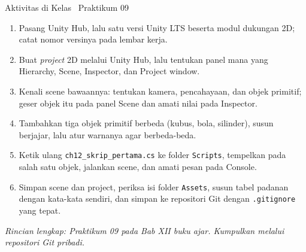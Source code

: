 \documentclass[aspectratio=169,10pt]{beamer}
\begin{document}
\begin{frame}{Aktivitas di Kelas \textperiodcentered\ Praktikum 09}
\begin{enumerate}
  \item Pasang Unity Hub, lalu satu versi Unity LTS beserta modul dukungan 2D;
        catat nomor versinya pada lembar kerja.
  \item Buat \emph{project} 2D melalui Unity Hub, lalu tentukan panel mana yang
        Hierarchy, Scene, Inspector, dan Project window.
  \item Kenali scene bawaannya: tentukan kamera, pencahayaan, dan objek
        primitif; geser objek itu pada panel Scene dan amati nilai pada
        Inspector.
  \item Tambahkan tiga objek primitif berbeda (kubus, bola, silinder), susun
        berjajar, lalu atur warnanya agar berbeda-beda.
  \item Ketik ulang \texttt{ch12\_skrip\_pertama.cs} ke folder
        \texttt{Scripts}, tempelkan pada salah satu objek, jalankan scene, dan
        amati pesan pada Console.
  \item Simpan scene dan project, periksa isi folder \texttt{Assets}, susun
        tabel padanan dengan kata-kata sendiri, dan simpan ke repositori Git
        dengan \texttt{.gitignore} yang tepat.
\end{enumerate}
\vspace{0.08cm}
{\footnotesize\color{ubAccent}\itshape Rincian lengkap: Praktikum 09 pada Bab
XII buku ajar. Kumpulkan melalui repositori Git pribadi.}
\end{frame}
\end{document}
